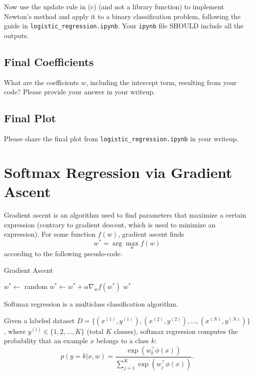 \documentclass[lang=cn,11pt]{elegantbook}
\begin{document}
Now use the update rule in (c) (and not a library function) to implement Newton’s method and apply it to a binary classification problem, following the guide in \texttt{logistic\_regression.ipynb}. Your \texttt{ipynb} file SHOULD include all the outputs.

\subsection{Final Coefficients}

What are the coefficients $w$, including the intercept term, resulting from your code? Please provide your answer in your writeup.

\subsection{Final Plot}

Please share the final plot from \texttt{logistic\_regression.ipynb} in your writeup.



\section{Softmax Regression via Gradient Ascent}

Gradient ascent is an algorithm used to find parameters that maximize a certain expression (contrary to
gradient descent, which is used to minimize an expression). For some function $f(w)$, gradient ascent finds
\begin{equation}
    w^* = \arg\max_w f(w)
\end{equation}
according to the following pseudo-code:

\begin{algorithm}
\caption{Gradient Ascent}
\begin{algorithmic}[1]
    \State $w^* \gets$ random
    \Repeat
        \State $w^* \gets w^* + \alpha \nabla_w f(w^*)$
    \State \Return $w^*$
\end{algorithmic}
\end{algorithm}

Softmax regression is a multiclass classification algorithm. 

Given a labeled dataset \(D = \{(x^{(1)}, y^{(1)}), (x^{(2)}, y^{(2)}), ..., (x^{(N)}, y^{(N)})\}\), where $y^{(i)} \in \{1, 2, ...,K\}$ (total $K$ classes), softmax regression computes the probability that an example $x$ belongs to a class $k$:
\begin{equation}
    p(y = k | x, w) = \frac{\exp(w_k^\top \phi(x))}{\sum_{j=1}^{K} \exp(w_j^\top \phi(x))}.
\end{equation}
\end{document}
